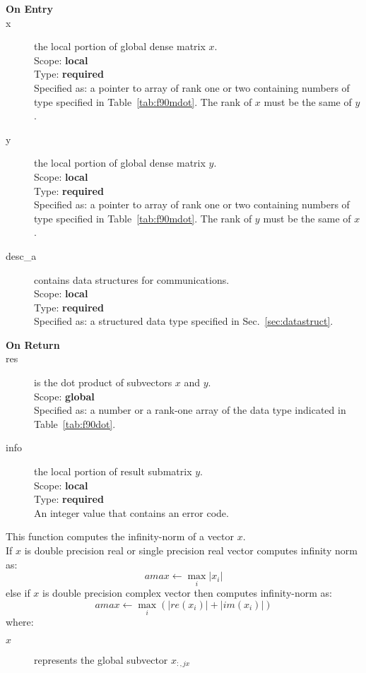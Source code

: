 \begin{description}
\item[\bf On Entry]
\item[x] the local portion of global dense matrix
$x$. \\
Scope: {\bf local} \\
Type: {\bf required} \\
Specified as: a pointer to array of rank one or two
containing numbers of type specified in
Table~\ref{tab:f90mdot}. The rank of $x$ must be the same of $y$. 
\item[y] the local portion of global dense matrix
$y$. \\
Scope: {\bf local} \\
Type: {\bf required} \\
Specified as: a pointer to array of rank one or two
containing numbers of type specified in
Table~\ref{tab:f90mdot}. The rank of $y$ must be the same of $x$. 
\item[desc\_a] contains data structures for communications.\\
Scope: {\bf local} \\
Type: {\bf required}\\
Specified as: a structured data type specified in Sec.~\ref{sec:datastruct}.
\item[\bf On Return] 
\item[res] is the dot product of subvectors $x$ and $y$.\\
Scope: {\bf global} \\
Specified as: a number or a rank-one array  of the data type indicated
in Table~\ref{tab:f90dot}. 
\item[info] the local portion of result submatrix $y$.\\
Scope: {\bf local} \\
Type: {\bf required} \\
An integer value that contains an error code. 
\end{description}

%
%



This function computes 
 the infinity-norm of a vector $x$.\\
If $x$ is double precision real or single precision real vector
computes infinity norm as:
\[ amax \leftarrow \max_i |x_i|\]
else if $x$ is double precision complex vector then computes infinity-norm  as:
\[ amax \leftarrow \max_i {(|re(x_i)| + |im(x_i)|)}\]
where:
\begin{description}
\item[$x$] represents the global subvector $x_{:,jx}$
\end{description}

